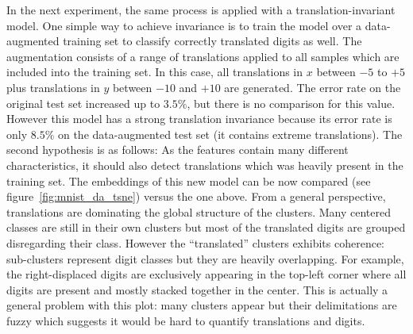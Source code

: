 \documentclass[a4paper,12pt]{report}
\begin{document}
In the next experiment, the same process is applied with a translation-invariant model.
One simple way to achieve invariance is to train the model over a data-augmented training set to classify correctly translated digits as well.
The augmentation consists of a range of translations applied to all samples which are included into the training set.
In this case, all translations in $x$ between $-5$ to $+5$ plus translations in $y$ between $-10$ and $+10$ are generated.
The error rate on the original test set increased up to $3.5\%$, but there is no comparison for this value.
However this model has a strong translation invariance because its error rate is only $8.5\%$ on the data-augmented test set (it contains extreme translations).
The second hypothesis is as follows: As the features contain many different characteristics, it should also detect translations which was heavily present in the training set.
The embeddings of this new model can be now compared (see figure~\ref{fig:mnist_da_tsne}) versus the one above.
From a general perspective, translations are dominating the global structure of the clusters.
Many centered classes are still in their own clusters but most of the translated digits are grouped disregarding their class.
However the ``translated'' clusters exhibits coherence: sub-clusters represent digit classes but they are heavily overlapping.
For example, the right-displaced digits are exclusively appearing in the top-left corner where all digits are present and mostly stacked together in the center.
This is actually a general problem with this plot: many clusters appear but their delimitations are fuzzy which suggests it would be hard to quantify translations and digits.
\end{document}
